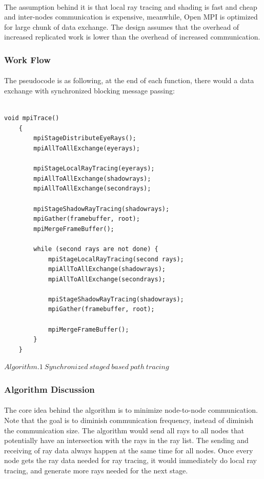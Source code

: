 \documentclass[a4paper, oneside, 10pt]{article}
\begin{document}
\paragraph{}The assumption behind it is that local ray tracing and shading is fast and cheap and inter-nodes communication is expensive, meanwhile, Open MPI is optimized for large chunk of data exchange. The design assumes that the overhead of increased replicated work is lower than the overhead of increased communication.
\subsubsection{Work Flow}
\paragraph{}The pseudocode is as following, at the end of each function, there would a data exchange with synchronized blocking message passing:\\
\\
\lstset{language=c++}
\begin{lstlisting}[frame=single]
    void mpiTrace()
    {
        mpiStageDistributeEyeRays();
        mpiAllToAllExchange(eyerays);
        
        mpiStageLocalRayTracing(eyerays);
        mpiAllToAllExchange(shadowrays);
        mpiAllToAllExchange(secondrays);
        
        mpiStageShadowRayTracing(shadowrays);
        mpiGather(framebuffer, root);
       	mpiMergeFrameBuffer();
        
        while (second rays are not done) {
            mpiStageLocalRayTracing(second rays);
            mpiAllToAllExchange(shadowrays);
            mpiAllToAllExchange(secondrays);
            
            mpiStageShadowRayTracing(shadowrays);
            mpiGather(framebuffer, root);
            
            mpiMergeFrameBuffer();
        }
    }
\end{lstlisting}
$Algorithm. 1\ Synchronized\ staged\ based\ path\ tracing$
\subsubsection{Algorithm Discussion}
\paragraph{} The core idea behind the algorithm is to minimize node-to-node communication. Note that the goal is to diminish communication frequency, instead of diminish the communication size. The algorithm would send all rays to all nodes that potentially have an intersection with the rays in the ray list. The sending and receiving of ray data always happen at the same time for all nodes. Once every node gets the ray data needed for ray tracing, it would immediately do local ray tracing, and generate more rays needed for the next stage. 
\end{document}
